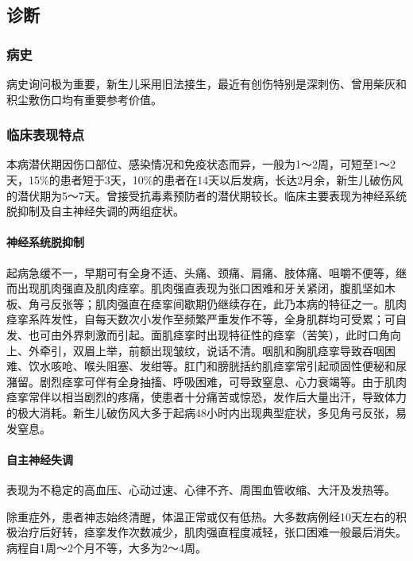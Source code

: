 \subsection{诊断}

\subsubsection{病史}

病史询问极为重要，新生儿采用旧法接生，最近有创伤特别是深刺伤、曾用柴灰和积尘敷伤口均有重要参考价值。

\subsubsection{临床表现特点}

本病潜伏期因伤口部位、感染情况和免疫状态而异，一般为1～2周，可短至1～2天，15\%的患者短于3天，10\%的患者在14天以后发病，长达2月余，新生儿破伤风的潜伏期为5～7天。曾接受抗毒素预防者的潜伏期较长。临床主要表现为神经系统脱抑制及自主神经失调的两组症状。

\paragraph{神经系统脱抑制}

起病急缓不一，早期可有全身不适、头痛、颈痛、肩痛、肢体痛、咀嚼不便等，继而出现肌肉强直及肌肉痉挛。肌肉强直表现为张口困难和牙关紧闭，腹肌坚如木板、角弓反张等；肌肉强直在痉挛间歇期仍继续存在，此乃本病的特征之一。肌肉痉挛系阵发性，自每天数次小发作至频繁严重发作不等，全身肌群均可受累；可自发、也可由外界刺激而引起。面肌痉挛时出现特征性的痉挛（苦笑），此时口角向上、外牵引，双眉上举，前额出现皱纹，说话不清。咽肌和胸肌痉挛导致吞咽困难、饮水咳呛、喉头阻塞、发绀等。肛门和膀胱括约肌痉挛常引起顽固性便秘和尿潴留。剧烈痉挛可伴有全身抽搐、呼吸困难，可导致窒息、心力衰竭等。由于肌肉痉挛常伴以相当剧烈的疼痛，使患者十分痛苦或惊恐，发作后大量出汗，导致体力的极大消耗。新生儿破伤风大多于起病48小时内出现典型症状，多见角弓反张，易发窒息。

\paragraph{自主神经失调}

表现为不稳定的高血压、心动过速、心律不齐、周围血管收缩、大汗及发热等。

除重症外，患者神志始终清醒，体温正常或仅有低热。大多数病例经10天左右的积极治疗后好转，痉挛发作次数减少，肌肉强直程度减轻，张口困难一般最后消失。病程自1周～2个月不等，大多为2～4周。

